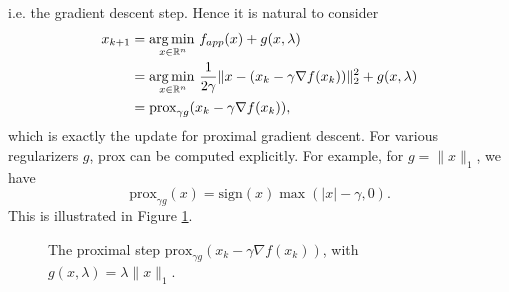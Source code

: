 \documentclass[11pt, twoside]{report}
\begin{document}
i.e. the gradient descent step. Hence it is natural to consider
\begin{align*}
    x_{k+1} &= \operatorname*{arg\, min \,}_{x \in \mathbb{R}^n} f_{app}(x) + g(x,\lambda) \\
    &= \operatorname*{arg\, min \,}_{x \in \mathbb{R}^n} \frac{1}{2 \gamma} \|x - (x_k - \gamma \nabla f(x_k))\|_2^2 + g(x,\lambda) \\
    &= \mathrm{prox}_{\gamma g}(x_k - \gamma \nabla f(x_k)),
\end{align*}
which is exactly the update for proximal gradient descent. For various regularizers $g$, prox can be computed explicitly. For example, for $g = \|x\|_1$, we have $$\mathrm{prox}_{\gamma g}(x) = \mathrm{sign}(x) \max(|x|-\gamma,0).$$ This is illustrated in Figure \ref{fig:prox_lasso}.

\begin{figure}[h!]
    \centering
    \caption{The proximal step $\mathrm{prox}_{\gamma g}(x_k - \gamma \nabla f(x_k))$, with $g(x,\lambda) = \lambda \|x\|_1$.}
    \label{fig:prox_lasso}
\end{figure}
\end{document}
